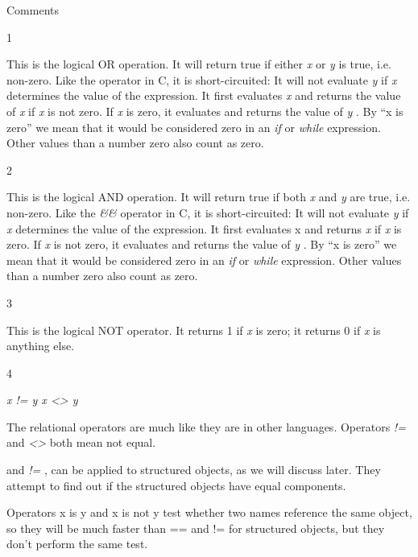 Comments

1



This is the logical OR operation.
It will return true if either \emph{x} or \emph{y} is true, i.e.
non-zero. Like the \emph{\textbar{}\textbar{}} operator in C, it is
short-circuited: It will not evaluate \emph{y} if \emph{x} determines
the value of the expression. It first evaluates \emph{x} and returns the
value of \emph{x} if \emph{x} is not zero. If \emph{x} is zero, it
evaluates and returns the value of \emph{y} . By ``x is zero'' we mean
that it would be considered zero in an \emph{if} or \emph{while}
expression. Other values than a number zero also count as zero.

2



This is the logical AND operation.
It will return true if both \emph{x} and \emph{y} are true, i.e.
non-zero. Like the \emph{\&\&} operator in C, it is short-circuited: It
will not evaluate \emph{y} if \emph{x} determines the value of the
expression. It first evaluates x and returns \emph{x} if \emph{x} is
zero. If \emph{x} is not zero, it evaluates and returns the value of
\emph{y} . By ``x is zero'' we mean that it would be considered zero in
an \emph{if} or \emph{while} expression. Other values than a number zero
also count as zero.

3



This is the logical NOT operator.
It returns 1 if \emph{x} is zero; it returns 0 if \emph{x} is anything
else.

4











 \emph{x != y x
\textless{}\textgreater{} y}









The relational operators are much
like they are in other languages. Operators \emph{!=} and
\emph{\textless{}\textgreater{}} both mean not equal.


and \emph{!=} , can be applied to structured objects, as we will discuss
later. They attempt to find out if the structured objects have equal
components.

Operators x is y and x is not y
test whether two names reference the same object, so they will be much
faster than == and != for structured objects, but they don't perform the
same test.

